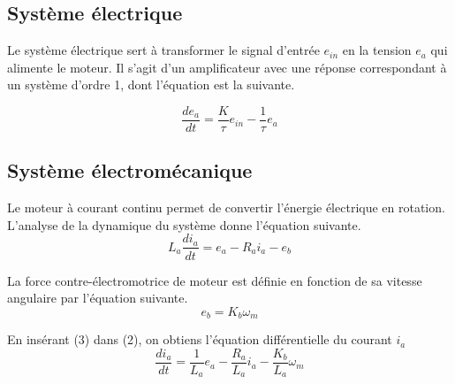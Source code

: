 \documentclass{udes_rapport} %
\begin{document}
\subsection{Système électrique}
Le système électrique sert à transformer le signal d'entrée $e_{in}$ en la tension $e_a$ qui alimente le moteur.
Il s'agit d'un amplificateur avec une réponse correspondant à un système d'ordre 1, dont l'équation est la suivante.

\begin{equation}
\frac{de_a}{dt} = \frac{K}{\tau}e_{in} - \frac{1}{\tau}e_a
\end{equation}

\subsection{Système électromécanique}
Le moteur à courant continu permet de convertir l'énergie électrique en rotation. 
L'analyse de la dynamique du système donne l'équation suivante.
\begin{equation}
L_a\frac{di_a}{dt} = e_a-R_ai_a - e_b
\end{equation}

La force contre-électromotrice de moteur est définie en fonction de sa vitesse angulaire par l'équation suivante.
\begin{equation}
e_b = K_b\omega_m
\end{equation}

En insérant (3) dans (2), on obtiens l'équation différentielle du courant $i_a$
\begin{equation}
\frac{di_a}{dt} = \frac{1}{L_a}e_a-\frac{R_a}{L_a}i_a - \frac{K_b}{L_a}\omega_m
\end{equation}
\end{document}
